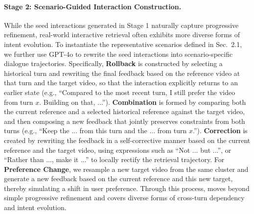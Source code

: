 \paragraph{Stage 2: Scenario-Guided Interaction Construction.}
While the seed interactions generated in Stage 1 naturally capture progressive refinement, real-world interactive retrieval often exhibits more diverse forms of intent evolution. To instantiate the representative scenarios defined in Sec.~2.1, we further use GPT-4o to rewrite the seed interactions into scenario-specific dialogue trajectories. Specifically, \textbf{Rollback} is constructed by selecting a historical turn and rewriting the final feedback based on the reference video at that turn and the target video, so that the interaction explicitly returns to an earlier state (e.g., ``Compared to the most recent turn, I still prefer the video from turn \(x\). Building on that, ...''). \textbf{Combination} is formed by comparing both the current reference and a selected historical reference against the target video, and then composing a new feedback that jointly preserves constraints from both turns (e.g., ``Keep the ... from this turn and the ... from turn \(x\).''). \textbf{Correction} is created by rewriting the feedback in a self-corrective manner based on the current reference and the target video, using expressions such as ``Not ... but ...'', or ``Rather than ..., make it ...'' to locally rectify the retrieval trajectory. For \textbf{Preference Change}, we resample a new target video from the same cluster and generate a new feedback based on the current reference and this new target, thereby simulating a shift in user preference. Through this process, \Mybenchmark moves beyond simple progressive refinement and covers diverse forms of cross-turn dependency and intent evolution.

